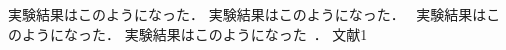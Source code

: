 
\begin{thebibliography}{1}
実験結果はこのようになった．\cite{1}
実験結果はこのようになった．~\cite{1}
実験結果はこのようになった\cite{1}．
実験結果はこのようになった~\cite{1}．
 文献1
\end{thebibliography}
